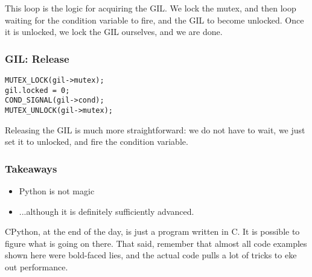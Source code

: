 This loop is the logic for acquiring the GIL.
We lock the mutex,
and then loop waiting for the condition variable to fire,
and the GIL to become unlocked.
Once it is unlocked,
we lock the GIL ourselves,
and we are done.


\begin{frame}[fragile]
\frametitle{GIL: Release}
\begin{lstlisting}
MUTEX_LOCK(gil->mutex);
gil.locked = 0;
COND_SIGNAL(gil->cond);
MUTEX_UNLOCK(gil->mutex);
\end{lstlisting}
\end{frame}

Releasing the GIL is much more straightforward:
we do not have to wait,
we just set it to unlocked,
and fire the condition variable.

\begin{frame}
\frametitle{Takeaways}

\begin{itemize}
\item Python is not magic\pause
\item ...although it is definitely sufficiently advanced.
\end{itemize}
\end{frame}

CPython,
at the end of the day,
is just a program written in C.
It is possible to figure what is going on there.
That said,
remember that almost all code examples shown here were
bold-faced lies,
and the actual code pulls a lot of tricks to eke out performance.


